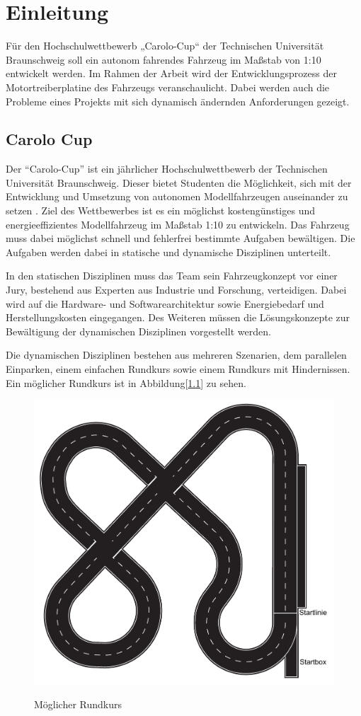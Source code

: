 \chapter{Einleitung}

Für den Hochschulwettbewerb „Carolo-Cup“ der Technischen Universität Braunschweig soll ein autonom fahrendes Fahrzeug im Maßstab von 1:10
entwickelt werden. Im Rahmen der Arbeit wird der Entwicklungsprozess der Motortreiberplatine des Fahrzeugs veranschaulicht.
Dabei werden auch die Probleme eines Projekts mit sich dynamisch ändernden Anforderungen gezeigt. 


\section{Carolo Cup}
Der ``Carolo-Cup'' ist ein jährlicher Hochschulwettbewerb der Technischen Universität Braunschweig. Dieser bietet Studenten die Möglichkeit, sich mit der Entwicklung 
und Umsetzung von autonomen Modellfahrzeugen auseinander zu setzen \cite{website-carolo-cup}. Ziel des Wettbewerbes ist es ein möglichst kostengünstiges
und energieeffizientes Modellfahrzeug im Maßstab 1:10 zu entwickeln. Das Fahrzeug muss dabei möglichst schnell und fehlerfrei bestimmte Aufgaben
bewältigen. Die Aufgaben werden dabei in statische und dynamische Disziplinen unterteilt. 

In den statischen Disziplinen muss das Team sein Fahrzeugkonzept vor einer Jury, bestehend aus Experten aus Industrie und Forschung, verteidigen.
Dabei wird auf die Hardware- und Softwarearchitektur sowie Energiebedarf und Herstellungskosten eingegangen. Des Weiteren müssen die Lösungskonzepte
zur Bewältigung der dynamischen Disziplinen vorgestellt werden.

Die dynamischen Disziplinen bestehen aus mehreren Szenarien, dem parallelen Einparken, einem einfachen Rundkurs sowie einem Rundkurs mit Hindernissen.
Ein möglicher Rundkurs ist in Abbildung[\ref{fig:Rundkurs}] zu sehen.

\begin{figure}[H]
\centering
\includegraphics[width=.8\textwidth]{Strecke.png}\\
\caption{Möglicher Rundkurs \cite{website-carolo-cup-regelwerk}}
\label{fig:Rundkurs}
\end{figure}

